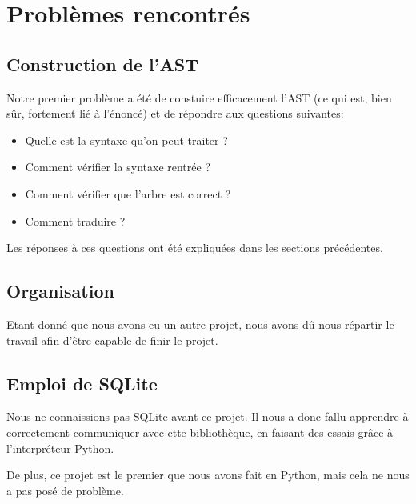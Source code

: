 \documentclass[]{article}
\begin{document}
\section{Probl\`emes rencontr\'es}
\subsection{Construction de l'AST}
Notre premier probl\`eme a \'et\'e de constuire efficacement l'AST (ce qui est, bien s\^ur, fortement li\'e \`a l'\'enonc\'e) et de r\'epondre aux questions suivantes:
\begin{itemize}
	\item Quelle est la syntaxe qu'on peut traiter ?
	\item Comment v\'erifier la syntaxe rentr\'ee ?
	\item Comment v\'erifier que l'arbre est correct ?
	\item Comment traduire ?
\end{itemize}

Les r\'eponses \`a ces questions ont \'et\'e expliqu\'ees dans les sections pr\'ec\'edentes.

\subsection{Organisation}
Etant donn\'e que nous avons eu un autre projet, nous avons d\^u nous r\'epartir le travail afin d'\^etre capable de finir le projet.

\subsection{Emploi de SQLite}
Nous ne connaissions pas SQLite avant ce projet. Il nous a donc fallu apprendre \`a correctement communiquer avec ctte biblioth\`eque, en faisant des essais gr\^ace \`a l'interpr\'eteur Python.

De plus, ce projet est le premier que nous avons fait en Python, mais cela ne nous a pas pos\'e de probl\`eme.
\end{document}
